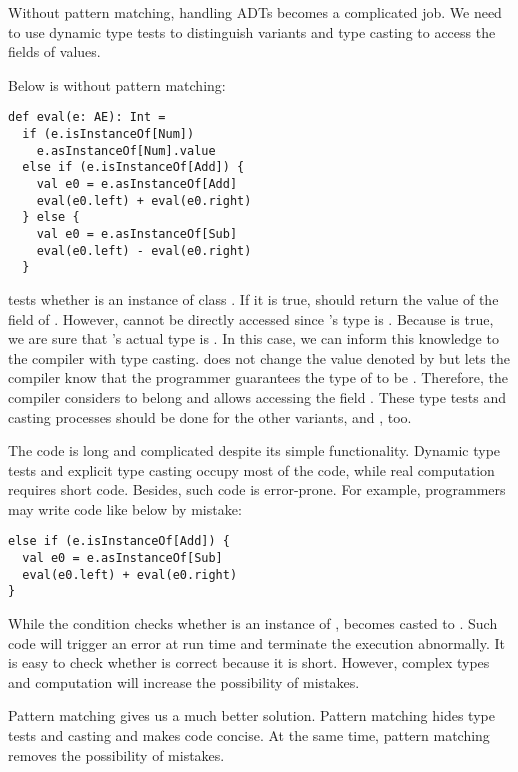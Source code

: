 Without pattern matching, handling ADTs becomes a complicated job. We need to
use dynamic type tests to distinguish variants and type casting to access the
fields of values.

Below is  without pattern matching:

\begin{verbatim}
def eval(e: AE): Int =
  if (e.isInstanceOf[Num])
    e.asInstanceOf[Num].value
  else if (e.isInstanceOf[Add]) {
    val e0 = e.asInstanceOf[Add]
    eval(e0.left) + eval(e0.right)
  } else {
    val e0 = e.asInstanceOf[Sub]
    eval(e0.left) - eval(e0.right)
  }
\end{verbatim}

 tests whether  is an instance of class
. If it is true,  should return the value of the field
 of . However,  cannot be directly accessed
since 's type is . Because  is true,
we are sure that 's actual type is . In this case, we can
inform this knowledge to the compiler with type casting. 
does not change the value denoted by  but lets the compiler know that
the programmer guarantees the type of  to be . Therefore, the
compiler considers  to belong  and allows
accessing the field . These type tests and casting processes should
be done for the other variants,  and , too.

The code is long and complicated despite its simple functionality. Dynamic type
tests and explicit type casting occupy most of the code, while real
computation requires short code. Besides, such code is error-prone.
For example, programmers may write code like below by mistake:

\begin{verbatim}
else if (e.isInstanceOf[Add]) {
  val e0 = e.asInstanceOf[Sub]
  eval(e0.left) + eval(e0.right)
}
\end{verbatim}

While the condition checks whether  is an instance of ,
 becomes casted to . Such code will trigger an error at run
time and terminate the execution abnormally.
It is easy to check whether  is correct because it is short.
However, complex types and computation will increase the possibility of
mistakes.

Pattern matching gives us a much better solution. Pattern matching hides type
tests and casting and makes code concise. At the same time, pattern matching
removes the possibility of mistakes.

